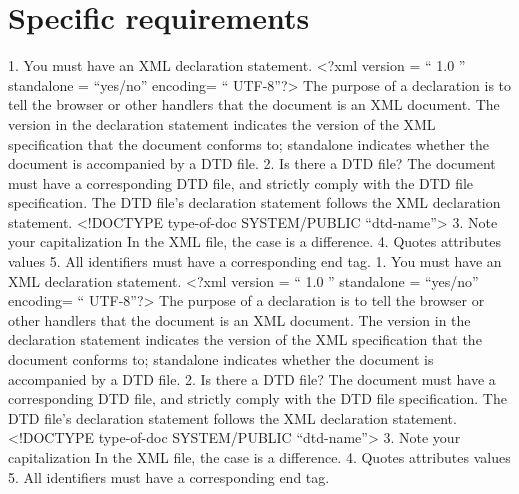 \section{Specific requirements}
1. You must have an XML declaration statement.
<?xml version = “ 1.0 ” standalone = “yes/no” encoding= “ UTF-8”?>
The purpose of a declaration is to tell the browser or other handlers that the document is an XML document. The version in the declaration statement indicates the version of the XML specification that the document conforms to; standalone indicates whether the document is accompanied by a DTD file. 
2. Is there a DTD file?
The document must have a corresponding DTD file, and strictly comply with the DTD file specification. The DTD file's declaration statement follows the XML declaration statement.
<!DOCTYPE type-of-doc SYSTEM/PUBLIC “dtd-name”>
3. Note your capitalization
In the XML file, the case is a difference.
4. Quotes attributes values
5. All identifiers must have a corresponding end tag.
1. You must have an XML declaration statement.
<?xml version = “ 1.0 ” standalone = “yes/no” encoding= “ UTF-8”?>
The purpose of a declaration is to tell the browser or other handlers that the document is an XML document. The version in the declaration statement indicates the version of the XML specification that the document conforms to; standalone indicates whether the document is accompanied by a DTD file. 
2. Is there a DTD file?
The document must have a corresponding DTD file, and strictly comply with the DTD file specification. The DTD file's declaration statement follows the XML declaration statement.
<!DOCTYPE type-of-doc SYSTEM/PUBLIC “dtd-name”>
3. Note your capitalization
In the XML file, the case is a difference.
4. Quotes attributes values
5. All identifiers must have a corresponding end tag.



